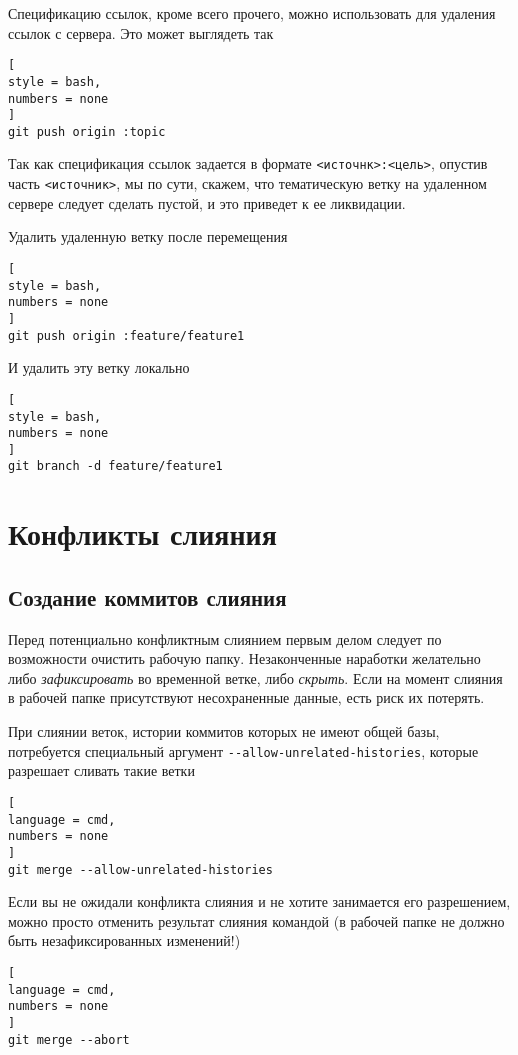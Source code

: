 \documentclass[%
	11pt,
	a4paper,
	utf8,
		]{article}
\begin{document}
Спецификацию ссылок, кроме всего прочего, можно использовать для удаления ссылок с сервера. Это может выглядеть так
\begin{lstlisting}[
style = bash,
numbers = none
]
git push origin :topic
\end{lstlisting}

Так как спецификация ссылок задается в формате \verb|<источнк>:<цель>|, опустив часть \verb|<источник>|, мы по сути, скажем, что тематическую ветку на удаленном сервере следует сделать пустой, и это приведет к ее ликвидации.

Удалить удаленную ветку после перемещения
\begin{lstlisting}[
style = bash,
numbers = none
]
git push origin :feature/feature1
\end{lstlisting}

И удалить эту ветку локально
\begin{lstlisting}[
style = bash,
numbers = none
]
git branch -d feature/feature1
\end{lstlisting}



\section{Конфликты слияния}

\subsection{Создание коммитов слияния}

Перед потенциально конфликтным слиянием первым делом следует по возможности очистить рабочую папку. Незаконченные наработки желательно либо \emph{зафиксировать} во временной ветке, либо \emph{скрыть}. Если на момент слияния в рабочей папке присутствуют несохраненные данные, есть риск их потерять.

При слиянии веток, истории коммитов которых не имеют общей базы, потребуется специальный аргумент \verb|--allow-unrelated-histories|, которые разрешает сливать такие ветки
\begin{lstlisting}[
language = cmd,
numbers = none
]
git merge --allow-unrelated-histories
\end{lstlisting}

Если вы не ожидали конфликта слияния и не хотите занимается его разрешением, можно просто отменить результат слияния командой (в рабочей папке не должно быть незафиксированных изменений!)
\begin{lstlisting}[
language = cmd,
numbers = none
]
git merge --abort
\end{lstlisting}
\end{document}
